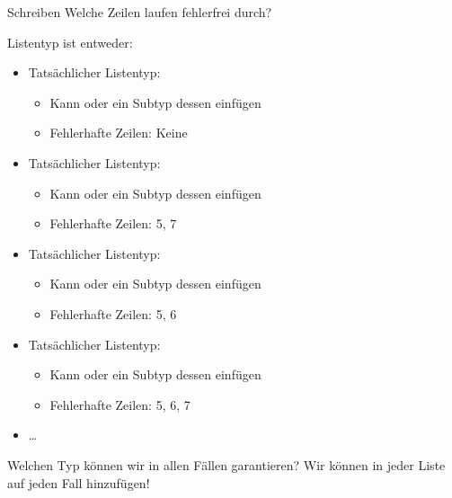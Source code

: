 \documentclass{../tuda-beamer}
\begin{document}
    \begin{frame}{Schreiben}
        Welche Zeilen laufen fehlerfrei durch?

        
    \end{frame}

    \begin{frame}[c]
        Listentyp ist entweder:

        \begin{itemize}
            \item Tatsächlicher Listentyp: 
            \begin{itemize}
                \item Kann  oder ein Subtyp dessen einfügen
                \item Fehlerhafte Zeilen: Keine
            \end{itemize}
            \item Tatsächlicher Listentyp: 
            \begin{itemize}
                \item Kann  oder ein Subtyp dessen einfügen
                \item Fehlerhafte Zeilen: 5, 7
            \end{itemize}
            \item Tatsächlicher Listentyp: 
            \begin{itemize}
                \item Kann  oder ein Subtyp dessen einfügen
                \item Fehlerhafte Zeilen: 5, 6
            \end{itemize}
            \item Tatsächlicher Listentyp: 
            \begin{itemize}
                \item Kann  oder ein Subtyp dessen einfügen
                \item Fehlerhafte Zeilen: 5, 6, 7
            \end{itemize}
            \item \dots
        \end{itemize}
    \end{frame}

    \begin{frame}[c]{Welchen Typ können wir in allen Fällen garantieren?}
        Wir können in jeder Liste auf jeden Fall  hinzufügen!

        
    \end{frame}
\end{document}
